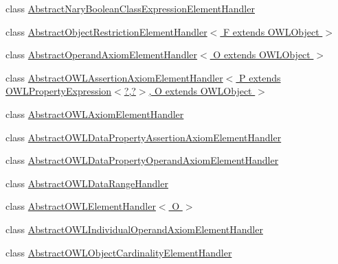 \begin{DoxyCompactItemize}
class \hyperlink{classorg_1_1coode_1_1owlapi_1_1owlxmlparser_1_1_abstract_nary_boolean_class_expression_element_handler}{Abstract\-Nary\-Boolean\-Class\-Expression\-Element\-Handler}
\item 
class \hyperlink{classorg_1_1coode_1_1owlapi_1_1owlxmlparser_1_1_abstract_object_restriction_element_handler_3_01a6e5f481157414f81851a356a68b7bfb}{Abstract\-Object\-Restriction\-Element\-Handler$<$ F extends O\-W\-L\-Object $>$}
\item 
class \hyperlink{classorg_1_1coode_1_1owlapi_1_1owlxmlparser_1_1_abstract_operand_axiom_element_handler_3_01_o_01extends_01_o_w_l_object_01_4}{Abstract\-Operand\-Axiom\-Element\-Handler$<$ O extends O\-W\-L\-Object $>$}
\item 
class \hyperlink{classorg_1_1coode_1_1owlapi_1_1owlxmlparser_1_1_abstract_o_w_l_assertion_axiom_element_handler_3400ddbb774fad720b1e593f64f8eec5c}{Abstract\-O\-W\-L\-Assertion\-Axiom\-Element\-Handler$<$ P extends O\-W\-L\-Property\-Expression$<$?,?$>$, O extends O\-W\-L\-Object $>$}
\item 
class \hyperlink{classorg_1_1coode_1_1owlapi_1_1owlxmlparser_1_1_abstract_o_w_l_axiom_element_handler}{Abstract\-O\-W\-L\-Axiom\-Element\-Handler}
\item 
class \hyperlink{classorg_1_1coode_1_1owlapi_1_1owlxmlparser_1_1_abstract_o_w_l_data_property_assertion_axiom_element_handler}{Abstract\-O\-W\-L\-Data\-Property\-Assertion\-Axiom\-Element\-Handler}
\item 
class \hyperlink{classorg_1_1coode_1_1owlapi_1_1owlxmlparser_1_1_abstract_o_w_l_data_property_operand_axiom_element_handler}{Abstract\-O\-W\-L\-Data\-Property\-Operand\-Axiom\-Element\-Handler}
\item 
class \hyperlink{classorg_1_1coode_1_1owlapi_1_1owlxmlparser_1_1_abstract_o_w_l_data_range_handler}{Abstract\-O\-W\-L\-Data\-Range\-Handler}
\item 
class \hyperlink{classorg_1_1coode_1_1owlapi_1_1owlxmlparser_1_1_abstract_o_w_l_element_handler_3_01_o_01_4}{Abstract\-O\-W\-L\-Element\-Handler$<$ O $>$}
\item 
class \hyperlink{classorg_1_1coode_1_1owlapi_1_1owlxmlparser_1_1_abstract_o_w_l_individual_operand_axiom_element_handler}{Abstract\-O\-W\-L\-Individual\-Operand\-Axiom\-Element\-Handler}
\item 
class \hyperlink{classorg_1_1coode_1_1owlapi_1_1owlxmlparser_1_1_abstract_o_w_l_object_cardinality_element_handler}{Abstract\-O\-W\-L\-Object\-Cardinality\-Element\-Handler}
\item 

\end{DoxyCompactItemize}

